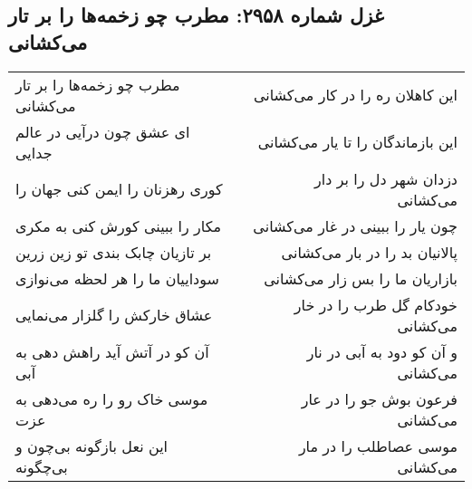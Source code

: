 \begin{center}
\section*{غزل شماره ۲۹۵۸: مطرب چو زخمه‌ها را بر تار می‌کشانی}
\label{sec:2958}
\begin{longtable}{l p{0.5cm} r}
مطرب چو زخمه‌ها را بر تار می‌کشانی
&&
این کاهلان ره را در کار می‌کشانی
\\
ای عشق چون درآیی در عالم جدایی
&&
این بازماندگان را تا یار می‌کشانی
\\
کوری رهزنان را ایمن کنی جهان را
&&
دزدان شهر دل را بر دار می‌کشانی
\\
مکار را ببینی کورش کنی به مکری
&&
چون یار را ببینی در غار می‌کشانی
\\
بر تازیان چابک بندی تو زین زرین
&&
پالانیان بد را در بار می‌کشانی
\\
سوداییان ما را هر لحظه می‌نوازی
&&
بازاریان ما را بس زار می‌کشانی
\\
عشاق خارکش را گلزار می‌نمایی
&&
خودکام گل طرب را در خار می‌کشانی
\\
آن کو در آتش آید راهش دهی به آبی
&&
و آن کو دود به آبی در نار می‌کشانی
\\
موسی خاک رو را ره می‌دهی به عزت
&&
فرعون بوش جو را در عار می‌کشانی
\\
این نعل بازگونه بی‌چون و بی‌چگونه
&&
موسی عصاطلب را در مار می‌کشانی
\\
\end{longtable}
\end{center}
